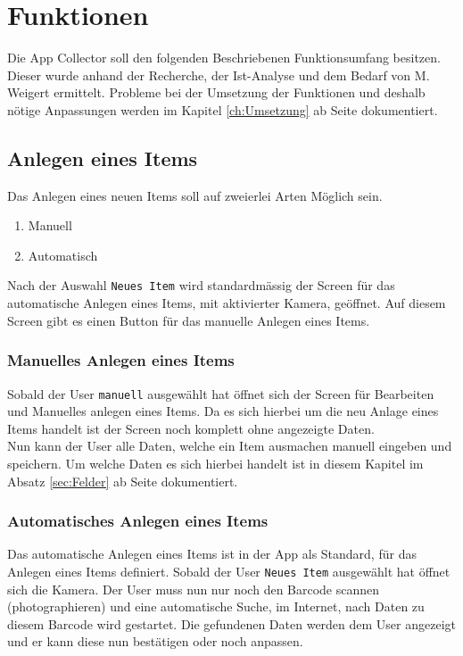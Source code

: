 \section{Funktionen}

Die App Collector soll den folgenden Beschriebenen Funktionsumfang besitzen. Dieser wurde anhand der Recherche, der Ist-Analyse und dem Bedarf von M. Weigert ermittelt. Probleme bei der Umsetzung der Funktionen und deshalb nötige Anpassungen werden im Kapitel \ref{ch:Umsetzung} ab Seite \pageref{ch:Umsetzung} dokumentiert.

\subsection{Anlegen eines Items}

Das Anlegen eines neuen Items soll auf zweierlei Arten Möglich sein.

\begin{enumerate}
	\item Manuell
	\item Automatisch
\end{enumerate}

Nach der Auswahl {\color{IndianRed}\texttt{Neues Item}} wird standardmässig der Screen für das automatische Anlegen eines Items, mit aktivierter Kamera, geöffnet. Auf diesem Screen gibt es einen Button für das manuelle Anlegen eines Items.

\subsubsection{Manuelles Anlegen eines Items}

Sobald der User {\color{IndianRed}\texttt{manuell}} ausgewählt hat öffnet sich der Screen für Bearbeiten und Manuelles anlegen eines Items. Da es sich hierbei um die neu Anlage eines Items handelt ist der Screen noch komplett ohne angezeigte Daten.\\

Nun kann der User alle Daten, welche ein Item ausmachen manuell eingeben und speichern. Um welche Daten es sich hierbei handelt ist in diesem Kapitel im Absatz \ref{sec:Felder} ab Seite \pageref{sec:Felder} dokumentiert.

\subsubsection{Automatisches Anlegen eines Items}

Das automatische Anlegen eines Items ist in der App als Standard, für das Anlegen eines Items definiert. Sobald der User {\color{IndianRed}\texttt{Neues Item}} ausgewählt hat öffnet sich die Kamera. Der User muss nun nur noch den Barcode scannen (photographieren) und eine automatische Suche, im Internet, nach Daten zu diesem Barcode wird gestartet. Die gefundenen Daten werden dem User angezeigt und er kann diese nun bestätigen oder noch anpassen.

